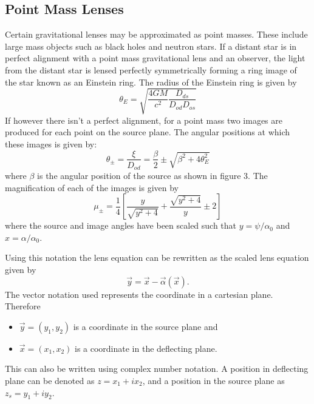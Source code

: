 \documentclass[a4paper]{IEEEtran}
\begin{document}
\subsection{Point Mass Lenses}
Certain gravitational lenses may be approximated as point masses. 
These include large mass objects such as black holes and neutron stars.
If a distant star is in perfect alignment with a point mass gravitational
lens and an observer, the light from the distant star is lensed 
perfectly symmetrically forming a ring image of the star known as an
Einstein ring. The radius of the Einstein ring is given by
\begin{equation}
    \theta_{E} = \sqrt{\frac{4GM}{c^2} \frac{D_{ds}}{D_{od} D_{os}}}
\end{equation}
If however there isn't a perfect alignment, for a point mass two
images are produced for each point on the source plane. 
The angular positions at which these images is given by:
\begin{equation}
    \theta_{\pm} = \frac{\xi}{D_{od}}
                 = \frac{\beta}{2} \pm \sqrt{\beta^2 + 4\theta^{2}_{E}}
\end{equation}
where $\beta$ is the angular position of the source as shown in figure 3.
The magnification of each of the images is given by
\begin{equation}
    \mu_{\pm} = \frac{1}{4} 
                \left[ 
                    \frac{y}{\sqrt{y^2 + 4}} 
                    +
                    \frac{\sqrt{y^2 + 4}}{y} 
                    \pm 2
                \right]
\end{equation}
where the source and image angles have been scaled such that 
$y = \psi / \alpha_0$ and $x = \alpha / \alpha_0$.

Using this notation the lens equation can be rewritten as the scaled
lens equation given by
\begin{equation}
    \vec{y} = \vec{x} - \vec{\alpha}(\vec{x}).
\end{equation}
The vector notation used represents the coordinate in a cartesian plane.
Therefore
\begin{itemize}
    \item $\vec{y} = (y_1, y_2)$ is a coordinate in the source plane and
    \item $\vec{x} = (x_1, x_2)$ is a coordinate in the deflecting plane.
\end{itemize}
This can also be written using complex number notation. A position in 
deflecting plane can be denoted as $z = x_1 + ix_2$, and a position in the
source plane as $z_s = y_1 + iy_2$.
\end{document}
